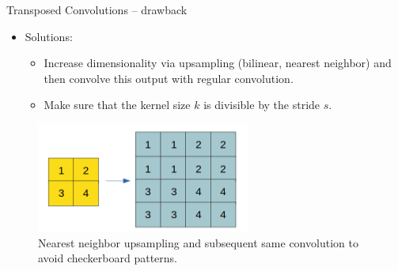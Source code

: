 \begin{vbframe}{Transposed Convolutions -- drawback}
\framebreak

\begin{itemize}
         \item Solutions: 
         \begin{itemize}
             \item Increase dimensionality via upsampling (bilinear, nearest neighbor) and then convolve this output with regular convolution.
             \item Make sure that the kernel size $k$ is divisible by the stride $s$.
         \end{itemize}
     \end{itemize}
     \begin{figure}
         \centering
         \includegraphics[width=7cm]{figure/transposedconv-last.png}
         \caption{Nearest neighbor upsampling and subsequent same convolution to avoid checkerboard patterns.}
     \end{figure}
\end{vbframe}
